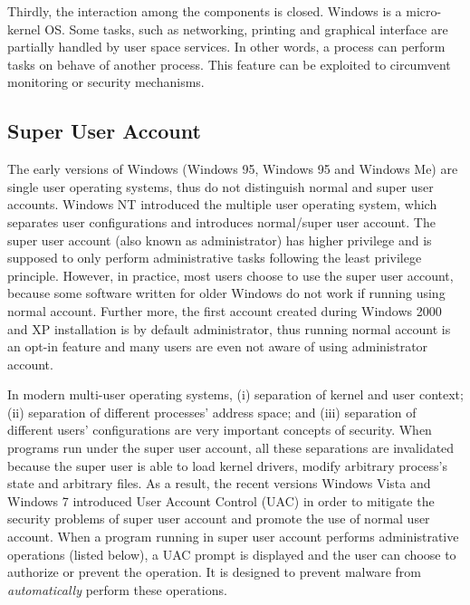 Thirdly, the interaction among the components is closed.
Windows is a micro-kernel OS.
Some tasks, such as networking, printing and graphical interface are partially
handled by user space services.
In other words, a process can perform tasks on behave of another process.
This feature can be exploited to circumvent monitoring or
security mechanisms.

\subsection{Super User Account}

The early versions of Windows (Windows 95, Windows 95 and Windows Me)
are single user operating systems, thus do not distinguish normal and
super user accounts.
Windows NT introduced the multiple user operating system, which
separates user configurations and introduces normal/super user account.
The super user account (also known as administrator) has higher privilege and
is supposed to only perform administrative tasks following the
least privilege principle.
However, in practice,
most users choose to use the super user account,
because some software written for older Windows do not work if running using
normal account.
Further more, the first account created during Windows 2000 and XP installation
is by default administrator,
thus running normal account is an opt-in feature and
many users are even not aware of using administrator account.

In modern multi-user operating systems,
(i) separation of kernel and user context;
(ii) separation of different processes' address space; and
(iii) separation of different users' configurations are
very important concepts of security.
When programs run under the super user account,
all these separations are invalidated because the super user
is able to load kernel drivers, modify arbitrary process's state
and arbitrary files.
As a result, the recent versions Windows Vista and Windows 7 introduced
User Account Control (UAC) in order to mitigate the security problems of
super user account and promote the use of normal user account.
When a program running in super user account performs administrative
operations (listed below),
a UAC prompt is displayed and the user can choose to authorize or prevent
the operation.
It is designed to prevent malware from {\em automatically}
perform these operations.

